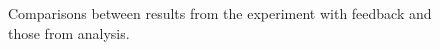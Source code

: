 \begin{figure}[ht]
\centering
{}
\caption{Comparisons between results from the experiment with feedback and those from analysis.}
\label{fig:2-16}
\end{figure}

